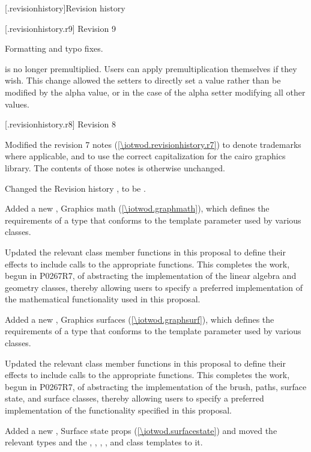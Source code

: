 \addtocounter{chapter}{-1} %
[\iotwod.revisionhistory]{Revision history}

 [\iotwod.revisionhistory.r9] {Revision 9}

\pnum
Formatting and typo fixes.

\pnum
{} is no longer premultiplied. Users can apply premultiplication themselves if they wish. This change allowed the setters to directly set a value rather than be modified by the alpha value, or in the case of the alpha setter modifying all other values.

 [\iotwod.revisionhistory.r8] {Revision 8}

\pnum
Modified the revision 7 notes (\ref{\iotwod.revisionhistory.r7}) to denote trademarks where applicable, and to use the correct capitalization for the cairo graphics library. The contents of those notes is otherwise unchanged.

\pnum
Changed the Revision history \clause, to be .

\pnum
Added a new \clause, Graphics math (\ref{\iotwod.graphmath}), which defines the requirements of a type that conforms to the \graphicsmathtemplparam template parameter used by various classes.

\pnum
Updated the relevant class member functions in this proposal to define their effects to include calls to the appropriate \graphicsmathtemplparam functions. This completes the work, begun in P0267R7, of abstracting the implementation of the linear algebra and geometry classes, thereby allowing users to specify a preferred implementation of the mathematical functionality used in this proposal.

\pnum
Added a new \clause, Graphics surfaces (\ref{\iotwod.graphsurf}), which defines the requirements of a type that conforms to the \graphicssurfacestemplparam template parameter used by various classes.

\pnum
Updated the relevant class member functions in this proposal to define their effects to include calls to the appropriate \graphicssurfacestemplparam functions. This completes the work, begun in P0267R7, of abstracting the implementation of the brush, paths, surface state, and surface classes, thereby allowing users to specify a preferred implementation of the functionality specified in this proposal.

\pnum
Added a new \clause, Surface state props (\ref{\iotwod.surfacestate}) and moved the relevant  types and the , , , , and  class templates to it. 

